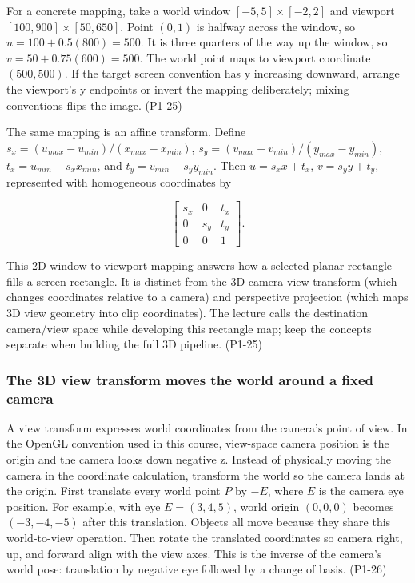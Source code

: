 For a concrete mapping, take a world window \([-5,5]\times[-2,2]\) and viewport \([100,900]\times[50,650]\). Point \((0,1)\) is halfway across the window, so \(u=100+0.5(800)=500\). It is three quarters of the way up the window, so \(v=50+0.75(600)=500\). The world point maps to viewport coordinate \((500,500)\). If the target screen convention has y increasing downward, arrange the viewport's y endpoints or invert the mapping deliberately; mixing conventions flips the image. (P1-25)

The same mapping is an affine transform. Define \(s_x=(u_{max}-u_{min})/(x_{max}-x_{min})\), \(s_y=(v_{max}-v_{min})/(y_{max}-y_{min})\), \(t_x=u_{min}-s_xx_{min}\), and \(t_y=v_{min}-s_yy_{min}\). Then \(u=s_xx+t_x\), \(v=s_yy+t_y\), represented with homogeneous coordinates by

\[
\begin{bmatrix}s_x&0&t_x\\0&s_y&t_y\\0&0&1\end{bmatrix}.
\]

This 2D window-to-viewport mapping answers how a selected planar rectangle fills a screen rectangle. It is distinct from the 3D camera view transform (which changes coordinates relative to a camera) and perspective projection (which maps 3D view geometry into clip coordinates). The lecture calls the destination camera/view space while developing this rectangle map; keep the concepts separate when building the full 3D pipeline. (P1-25)

\subsubsection{The 3D view transform moves the world around a fixed camera}\label{03-visual-computing-i-ch003-the-3d-view-transform-moves-the-world-around-a-fixed-camera}

A view transform expresses world coordinates from the camera's point of view. In the OpenGL convention used in this course, view-space camera position is the origin and the camera looks down negative z. Instead of physically moving the camera in the coordinate calculation, transform the world so the camera lands at the origin. First translate every world point \(P\) by \(-E\), where \(E\) is the camera eye position. For example, with eye \(E=(3,4,5)\), world origin \((0,0,0)\) becomes \((-3,-4,-5)\) after this translation. Objects all move because they share this world-to-view operation. Then rotate the translated coordinates so camera right, up, and forward align with the view axes. This is the inverse of the camera's world pose: translation by negative eye followed by a change of basis. (P1-26)

